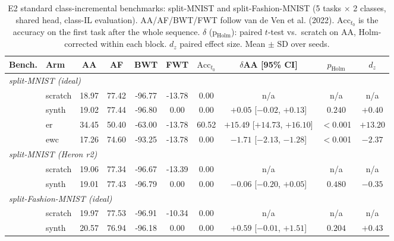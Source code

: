 \begin{table}[ht]
\centering
\small
\setlength{\tabcolsep}{4pt}
\caption{E2 standard class-incremental benchmarks: split-MNIST and split-Fashion-MNIST (5 tasks $\times$ 2 classes, shared head, class-IL evaluation). AA/AF/BWT/FWT follow van de Ven et al. (2022). $\text{Acc}_{t_0}$ is the accuracy on the first task after the whole sequence. $\delta$ (p$_{\text{Holm}}$): paired $t$-test vs.\ scratch on AA, Holm-corrected within each block. $d_z$ paired effect size. Mean $\pm$ SD over seeds.}
\label{tab:e234_bench5}
\begin{tabular}{llccccc@{\hskip 4pt}ccc}
\toprule
Bench. & Arm & AA & AF & BWT & FWT & $\text{Acc}_{t_0}$ & $\delta$AA [95\% CI] & $p_{\text{Holm}}$ & $d_z$ \\
\midrule
\multicolumn{10}{l}{\textit{split-MNIST (ideal)}} \\
& scratch & 18.97 & 77.42 & -96.77 & -13.78 & 0.00 & n/a & n/a & n/a \\
& synth & 19.02 & 77.44 & -96.80 & 0.00 & 0.00 & $+0.05$ [$-0.02$, $+0.13$] & $0.240$ & $+0.40$ \\
& er & 34.45 & 50.40 & -63.00 & -13.78 & 60.52 & $+15.49$ [$+14.73$, $+16.10$] & $<$0.001 & $+13.20$ \\
& ewc & 17.26 & 74.60 & -93.25 & -13.78 & 0.00 & $-1.71$ [$-2.13$, $-1.28$] & $<$0.001 & $-2.37$ \\
\midrule
\multicolumn{10}{l}{\textit{split-MNIST (Heron r2)}} \\
& scratch & 19.06 & 77.34 & -96.67 & -13.39 & 0.00 & n/a & n/a & n/a \\
& synth & 19.01 & 77.43 & -96.79 & 0.00 & 0.00 & $-0.06$ [$-0.20$, $+0.05$] & $0.480$ & $-0.35$ \\
\midrule
\multicolumn{10}{l}{\textit{split-Fashion-MNIST (ideal)}} \\
& scratch & 19.97 & 77.53 & -96.91 & -10.34 & 0.00 & n/a & n/a & n/a \\
& synth & 20.57 & 76.94 & -96.18 & 0.00 & 0.00 & $+0.59$ [$-0.01$, $+1.51$] & $0.204$ & $+0.43$ \\
\bottomrule
\end{tabular}
\end{table}
